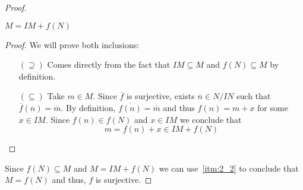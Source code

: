 \begin{problem}
\begin{enumerate}[label=(\theproblem.\arabic*),ref=\theproblem.\arabic*]
\begin{sol}
\begin{proof}
                    \begin{claim}
                        $M = IM + f(N)$
                        \begin{proof}
                            We will prove both inclusions:
                            \begin{itemize}
                                \item[$(\supseteq)$] Comes directly from the fact that $IM \subseteq M$ and $f(N) \subseteq M$ by definition.
                                \item[$(\subseteq)$] Take $m \in M$.
                                Since $\overline{f}$ is surjective, exists $\overline{n} \in N/IN$ such that $\overline{f}(\overline{n}) = \overline{m}$.
                                By definition, $\overline{f(n)} = \overline{m}$ and thus $f(n) = m + x$ for some $x \in IM$.
                                Since $f(n) \in f(N)$ and $x \in IM$ we conclude that
                                \[
                                    m = f(n) + x \in IM + f(N)
                                \]
                            \end{itemize}
                        \end{proof}
                    \end{claim}
                    Since $f(N) \subseteq M$ and $M = IM + f(N)$ we can use~\ref{itm:2_2} to conclude that $M = f(N)$ and thus, $f$ is surjective.
                \end{proof}
            \end{sol}
    \end{enumerate}
\end{problem}